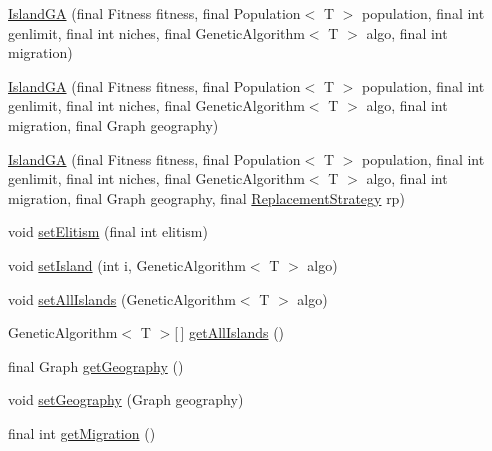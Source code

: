 \begin{CompactItemize}
\item 
\hyperlink{classjenes_1_1algorithms_1_1_island_g_a_3_01_t_01extends_01_chromosome_01_4_8cf783104bfb991a4a0db319cf2403c4}{IslandGA} (final Fitness fitness, final Population$<$ T $>$ population, final int genlimit, final int niches, final GeneticAlgorithm$<$ T $>$ algo, final int migration)
\item 
\hyperlink{classjenes_1_1algorithms_1_1_island_g_a_3_01_t_01extends_01_chromosome_01_4_aa6ac59257e351c4b2d50870ec48afee}{IslandGA} (final Fitness fitness, final Population$<$ T $>$ population, final int genlimit, final int niches, final GeneticAlgorithm$<$ T $>$ algo, final int migration, final Graph geography)
\item 
\hyperlink{classjenes_1_1algorithms_1_1_island_g_a_3_01_t_01extends_01_chromosome_01_4_84cea4b1aab39f58e8c98f66592cdc17}{IslandGA} (final Fitness fitness, final Population$<$ T $>$ population, final int genlimit, final int niches, final GeneticAlgorithm$<$ T $>$ algo, final int migration, final Graph geography, final \hyperlink{classjenes_1_1algorithms_1_1_island_g_a_3_01_t_01extends_01_chromosome_01_4_eb0e7c4ddd30e9472cfd2a280544ff51}{ReplacementStrategy} rp)
\item 
void \hyperlink{classjenes_1_1algorithms_1_1_island_g_a_3_01_t_01extends_01_chromosome_01_4_8789904f010dfb4d86c236f16738f3cc}{setElitism} (final int elitism)
\item 
void \hyperlink{classjenes_1_1algorithms_1_1_island_g_a_3_01_t_01extends_01_chromosome_01_4_eb79089c053c729f16d8c1c5c1aa2601}{setIsland} (int i, GeneticAlgorithm$<$ T $>$ algo)
\item 
void \hyperlink{classjenes_1_1algorithms_1_1_island_g_a_3_01_t_01extends_01_chromosome_01_4_46c43be9c86897a05eb25db32c0935c1}{setAllIslands} (GeneticAlgorithm$<$ T $>$ algo)
\item 
GeneticAlgorithm$<$ T $>$\mbox{[}$\,$\mbox{]} \hyperlink{classjenes_1_1algorithms_1_1_island_g_a_3_01_t_01extends_01_chromosome_01_4_adf9a8c907983a8ff03a6358b8270d82}{getAllIslands} ()
\item 
final Graph \hyperlink{classjenes_1_1algorithms_1_1_island_g_a_3_01_t_01extends_01_chromosome_01_4_36fb81c40aa049fc4af4c5a8ebdbc9e6}{getGeography} ()
\item 
void \hyperlink{classjenes_1_1algorithms_1_1_island_g_a_3_01_t_01extends_01_chromosome_01_4_c40da22bb9de811c6a2712a67184dc06}{setGeography} (Graph geography)
\item 
final int \hyperlink{classjenes_1_1algorithms_1_1_island_g_a_3_01_t_01extends_01_chromosome_01_4_74419cc71fe52538d241f7362b63709a}{getMigration} ()

\end{CompactItemize}
